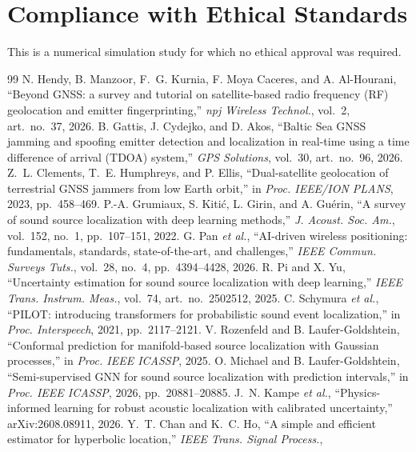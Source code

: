 \documentclass{article}
\newcommand{\etal}{\textit{et al.}}
\begin{document}
\section*{Compliance with Ethical Standards}
This is a numerical simulation study for which no ethical approval was
required.


\begin{thebibliography}{99}
\setlength{\itemsep}{0pt}\setlength{\parskip}{0pt}
 N. Hendy, B. Manzoor, F.~G. Kurnia, F. Moya Caceres,
and A. Al-Hourani, ``Beyond GNSS: a survey and tutorial on satellite-based
radio frequency (RF) geolocation and emitter fingerprinting,'' \emph{npj
Wireless Technol.}, vol.~2, art.~no.~37, 2026.
 B. Gattis, J. Cydejko, and D. Akos, ``Baltic Sea
GNSS jamming and spoofing emitter detection and localization in real-time
using a time difference of arrival (TDOA) system,'' \emph{GPS Solutions},
vol.~30, art.~no.~96, 2026.
 Z.~L. Clements, T.~E. Humphreys, and P. Ellis,
``Dual-satellite geolocation of terrestrial GNSS jammers from low Earth
orbit,'' in \emph{Proc. IEEE/ION PLANS}, 2023, pp.~458--469.
 P.-A. Grumiaux, S. Kiti\'{c}, L. Girin, and
A. Gu\'{e}rin, ``A survey of sound source localization with deep learning
methods,'' \emph{J. Acoust. Soc. Am.}, vol.~152, no.~1, pp.~107--151, 2022.
 G. Pan \etal, ``AI-driven wireless positioning:
fundamentals, standards, state-of-the-art, and challenges,'' \emph{IEEE
Commun. Surveys Tuts.}, vol.~28, no.~4, pp.~4394--4428, 2026.
 R. Pi and X. Yu, ``Uncertainty estimation for sound
source localization with deep learning,'' \emph{IEEE Trans. Instrum.
Meas.}, vol.~74, art.~no.~2502512, 2025.
 C. Schymura \etal, ``PILOT: introducing
transformers for probabilistic sound event localization,'' in
\emph{Proc. Interspeech}, 2021, pp.~2117--2121.
 V. Rozenfeld and B. Laufer-Goldshtein, ``Conformal
prediction for manifold-based source localization with Gaussian
processes,'' in \emph{Proc. IEEE ICASSP}, 2025.
 O. Michael and B. Laufer-Goldshtein,
``Semi-supervised GNN for sound source localization with prediction
intervals,'' in \emph{Proc. IEEE ICASSP}, 2026, pp.~20881--20885.
 J.~N. Kampe \etal, ``Physics-informed learning for
robust acoustic localization with calibrated uncertainty,''
arXiv:2608.08911, 2026.
 Y.~T. Chan and K.~C. Ho, ``A simple and efficient
estimator for hyperbolic location,'' \emph{IEEE Trans. Signal Process.},

\end{thebibliography}
\end{document}
